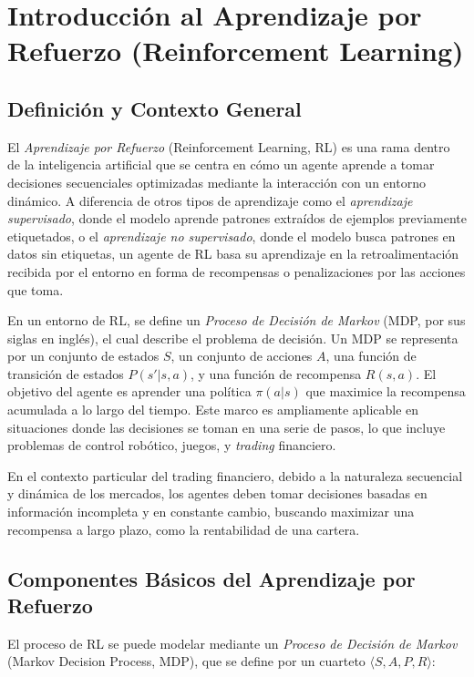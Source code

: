\documentclass[a4paper,12pt]{report}
\begin{document}
\section{Introducción al Aprendizaje por Refuerzo (Reinforcement Learning)}

\subsection{Definición y Contexto General}

El \textit{Aprendizaje por Refuerzo} (Reinforcement Learning, RL) es una rama dentro de la inteligencia 
artificial que se centra en cómo un agente aprende a tomar decisiones secuenciales optimizadas mediante 
la interacción con un entorno dinámico. A diferencia de otros tipos de aprendizaje como el 
\textit{aprendizaje supervisado}, donde el modelo aprende patrones extraídos de ejemplos previamente 
etiquetados, o el \textit{aprendizaje no supervisado}, donde el modelo busca patrones en datos sin 
etiquetas, un agente de RL basa su aprendizaje en la retroalimentación recibida por el entorno en 
forma de recompensas o penalizaciones por las acciones que toma.

En un entorno de RL, se define un \textit{Proceso de Decisión de Markov} (MDP, por sus siglas en inglés), 
el cual describe el problema de decisión. Un MDP se representa por un conjunto de estados \(S\), 
un conjunto de acciones \(A\), una función de transición de estados \(P(s'|s, a)\), y una función de 
recompensa \(R(s, a)\). El objetivo del agente es aprender una política \(\pi(a|s)\) que maximice la 
recompensa acumulada a lo largo del tiempo. Este marco es ampliamente aplicable en situaciones donde 
las decisiones se toman en una serie de pasos, lo que incluye problemas de control robótico, juegos, 
y \textit{trading} financiero.

En el contexto particular del trading financiero, debido a la naturaleza secuencial y dinámica de 
los mercados, los agentes deben tomar decisiones basadas en información incompleta y en constante 
cambio, buscando maximizar una recompensa a largo plazo, como la rentabilidad de una cartera.

\subsection{Componentes Básicos del Aprendizaje por Refuerzo}

El proceso de RL se puede modelar mediante un \textit{Proceso de Decisión de Markov} 
(Markov Decision Process, MDP), que se define por un cuarteto \(\langle S, A, P, R \rangle\):
\end{document}

